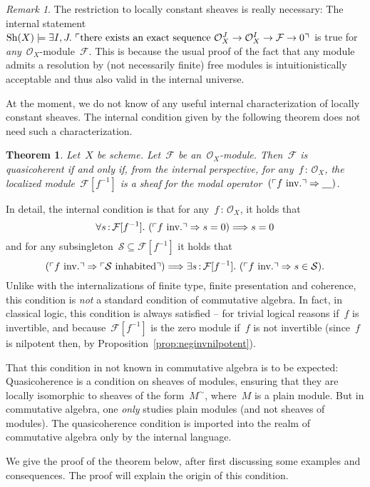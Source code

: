 \documentclass[10pt]{amsart}
\makeatletter
\theoremstyle{definition}
\theoremstyle{plain}
\newtheorem{thm}[defn]{Theorem}
\theoremstyle{remark}
\newtheorem{rem}[defn]{Remark}
\newcommand{\F}{\mathcal{F}}
\renewcommand{\O}{\mathcal{O}}
\renewcommand{\S}{\mathcal{S}}
\newcommand{\placeholder}{\underline{\quad}}
\newcommand{\Sh}{\mathrm{Sh}}
\newcommand{\?}{\,{:}\,}
\renewcommand{\_}{\mathpunct{.}\,}
\newcommand{\speak}[1]{\ulcorner\text{\textnormal{#1}}\urcorner}
\newcommand{\inv}{inv.\@}
\makeatother
\begin{document}
\begin{rem}The restriction to locally constant sheaves is really necessary: The
internal statement~$\Sh(X) \models \exists I,J\_ \speak{there exists an
exact sequence~$\O_X^J \to \O_X^I \to \F \to 0$}$ is true for
\emph{any}~$\O_X$-module~$\F$. This is because the usual proof of the fact that
any module admits a resolution by (not necessarily finite) free modules is
intuitionistically acceptable and thus also valid in the internal
universe.\end{rem}

At the moment, we do not know of any useful internal characterization of
locally constant sheaves. The internal condition given by the following
theorem does not need such a characterization.

\begin{thm}\label{thm:qcoh-sheafchar}
Let~$X$ be scheme. Let~$\F$ be an~$\O_X$-module. Then~$\F$ is
quasicoherent if and only if, from the internal perspective, for any~$f\?\O_X$,
the localized module~$\F[f^{-1}]$ is a sheaf for the modal operator~$(\speak{$f$ \inv}
\Rightarrow \placeholder)$.
\end{thm}

In detail, the internal condition is that for any~$f\?\O_X$, it holds that
\[ \forall s\?\F[f^{-1}]\_
  (\speak{$f$ \inv} \Rightarrow s = 0) \Longrightarrow s = 0 \]
and for any subsingleton~$\S \subseteq \F[f^{-1}]$ it holds that
\[ (\speak{$f$ \inv} \Rightarrow \speak{$\S$ inhabited}) \Longrightarrow
  \exists s\?\F[f^{-1}]\_
  (\speak{$f$ \inv} \Rightarrow s \in \S). \]
Unlike with the internalizations of finite type, finite presentation and
coherence, this condition is \emph{not} a standard condition of commutative
algebra. In fact, in classical logic, this condition is always satisfied --
for trivial logical reasons if~$f$ is invertible, and because~$\F[f^{-1}]$ is
the zero module if~$f$ is not invertible (since~$f$ is nilpotent then, by
Proposition~\ref{prop:neginvnilpotent}).

That this condition in not known in commutative algebra is to be expected:
Quasicoherence is a condition on sheaves of modules, ensuring
that they are locally isomorphic to sheaves of the form~$M^\sim$,
where~$M$ is a plain module. But in commutative algebra, one \emph{only} studies plain
modules (and not sheaves of modules). The quasicoherence condition is imported
into the realm of commutative algebra only by the internal language.

We give the proof of the theorem below, after first discussing some examples
and consequences. The proof will explain the origin of this condition.
\end{document}
